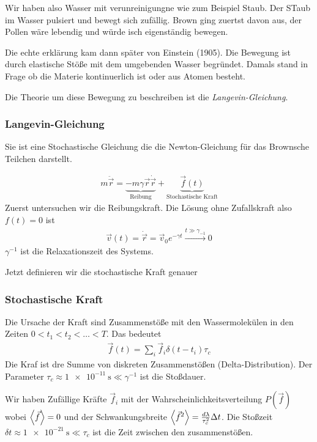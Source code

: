\begin{description}
Wir haben also Wasser mit verunreinigungne wie zum Beispiel Staub. Der STaub im
Wasser pulsiert und bewegt sich zufällig. Brown ging zuertst davon aus, der Pollen
wäre lebendig und würde isch eigenständig bewegen.

Die echte erklärung kam dann später von Einstein (1905). Die Bewegung ist durch elastische
 Stöße mit dem umgebenden Wasser begründet. Damals stand in Frage ob die Materie
 kontinuerlich ist oder aus Atomen besteht.

 Die Theorie um diese Bewegung zu beschreiben ist die \emph{Langevin-Gleichung}.

 \subsubsection*{Langevin-Gleichung}
 Sie ist eine Stochastische Gleichung die die Newton-Gleichung für das Brownsche
 Teilchen darstellt.

 \begin{align*}
   m \ddot{\vec{r}} = \underbrace{- m \gamma \vec{r} \dot{\vec{r}}}_{\text{Reibung}} + \underbrace{\vec{f}(t)}_{\text{Stochastische Kraft}}
 \end{align*}
 Zuerst untersuchen wir die Reibungskraft. Die Lösung ohne Zufallskraft also
 $f(t) = 0$ ist
 \begin{align*}
   \vec{v}(t) = \dot{\vec{r}} = \vec{v}_0 e^{-\gamma t} \xrightarrow{t \gg \gamma_{-1}} 0
 \end{align*}
 $\gamma^{-1}$ ist die Relaxationszeit des Systems.

 Jetzt definieren wir die stochastische Kraft genauer

\subsubsection*{Stochastische Kraft}
Die Ursache der Kraft sind Zusammenstöße mit den Wassermolekülen in den
Zeiten $ 0 < t_1 < t_2 < \ldots < T$.
Das bedeutet
%
\begin{align*}
  \vec{f}(t) = \sum_{i}^{} \vec{f}_i \delta(t-t_i) \tau_c
\end{align*}
%
Die Kraf ist dre Summe von diskreten Zusammenstößen (Delta-Distribution).
Der Parameter $\tau_c \approx \SI{1e-11}{\second} \ll \gamma^{-1}$ ist die Stoßdauer.

Wir haben Zufällige Kräfte $\vec{f}_i$ mit der Wahrscheinlichkeitsverteilung
$P(\vec{f})$ wobei $\Braket{\vec{f}} = 0$ und der Schwankungsbreite
$\Braket{\vec{f}^2} = \frac{d \lambda}{\tau_c^2} \Delta t$. Die Stoßzeit
$\delta t \approx \SI{1e-21}{\second} \ll \tau_c$ ist die Zeit zwischen den
zusammenstößen.


\end{description}
